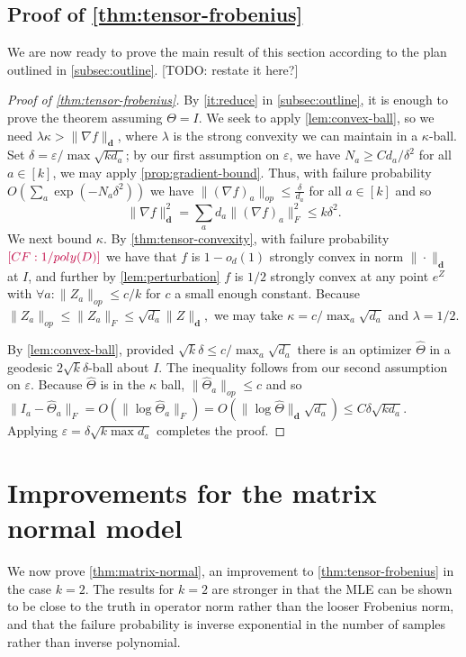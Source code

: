 \documentclass{article}
\renewcommand{\vec}{\bm}
\newcommand\eps{\varepsilon}
\newcommand{\CF}[1]{{\color{purple}[CF: #1]}}
\newcommand{\TODO}[1]{{\color{blue}[TODO: #1]}}
\begin{document}
\subsection{Proof of \cref{thm:tensor-frobenius}}
We are now ready to prove the main result of this section according to the plan outlined in \cref{subsec:outline}.
\TODO{restate it here?}
\begin{proof}[Proof of \cref{thm:tensor-frobenius}]By \cref{it:reduce} in \cref{subsec:outline}, it is enough to prove the theorem assuming $\Theta = I$.
We seek to apply \cref{lem:convex-ball}, so we need $\lambda \kappa > \|\nabla f\|_{\vec d}$, where $\lambda$ is the strong convexity we can maintain in a $\kappa$-ball. Set $\delta = \eps/\max \sqrt{k d_a}$; by our first assumption on $\eps$, we have $N_a \geq C d_a/\delta^2$ for all $a \in [k]$, we may apply \cref{prop:gradient-bound}. Thus, with failure probability $O\left( \sum_a \exp ( - N_a \delta^2)\right)$ we have $\|(\nabla f)_{a}\|_{op} \leq \frac{\delta}{d_{a}}$ for all $a \in [k]$ and so
\[  \|\nabla f\|_{\vec d}^{2} = \sum_{a} d_{a} \|(\nabla f)_{a}\|_{F}^{2} \leq  k \delta^{2}.  \]
We next bound $\kappa$. By \cref{thm:tensor-convexity}, with failure probability $\CF{1/poly(D)}$ we have that $f$ is $1-o_{d}(1)$ strongly convex in norm $\|\cdot\|_{\vec d}$ at $I$, and further by \cref{lem:perturbation} $f$ is $1/2$ strongly convex at any point $e^{Z}$ with $\forall a: \|Z_{a}\|_{op} \leq  c/k$ for $c$ a small enough constant. Because $\|Z_a\|_{op} \leq \|Z_a\|_F \leq \sqrt{d_a} \|Z\|_{\vec d},$ we may take $\kappa = c/\max_a \sqrt{d_a}$ and $\lambda = 1/2$.

By \cref{lem:convex-ball}, provided $\sqrt{k} \delta \leq c/\max_a \sqrt{d_a} $ there is an optimizer $\widehat{\Theta}$ in a geodesic $2 \sqrt{k} \delta$-ball about $I$. The inequality follows from our second assumption on $\eps$. Because $\widehat{\Theta}$ is in the $\kappa$ ball, $\|\widehat{\Theta}_a\|_{op} \leq c$ and so $\|I_a - \widehat{\Theta}_a\|_F = O( \| \log \widehat{\Theta}_a\|_F) = O( \|\log \widehat{\Theta}\|_{\vec d} \sqrt{d_a})  \leq C \delta \sqrt{k d_a}.$ Applying $\eps = \delta \sqrt{k \max d_a}$ completes the proof.
\end{proof}




\section{Improvements for the matrix normal model}\label{sec:matrix-normal}
We now prove \cref{thm:matrix-normal}, an improvement to \cref{thm:tensor-frobenius} in the case $k=2$. The results for $k = 2$ are stronger in that the MLE can be shown to be close to the truth in operator norm rather than the looser Frobenius norm, and that the failure probability is inverse exponential in the number of samples rather than inverse polynomial.
\end{document}
